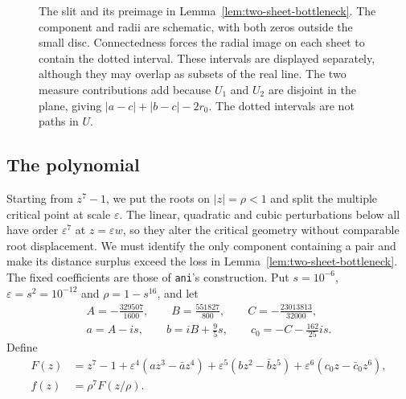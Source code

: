 \documentclass[11pt]{article}
\begin{document}
\begin{figure}[!htbp]
\caption{The slit and its preimage in Lemma~\ref{lem:two-sheet-bottleneck}.
The component and radii are schematic, with both zeros outside the small
disc. Connectedness forces the radial image on each sheet to contain the
dotted interval. These intervals are displayed separately, although they
may overlap as subsets of the real line. The two measure contributions
add because $U_1$ and $U_2$ are disjoint in the plane, giving
$|a-c|+|b-c|-2r_0$. The dotted intervals are not paths in $U$.}
\label{fig:two-sheet-bottleneck}
\end{figure}

\subsection{The polynomial}
Starting from $z^7-1$, we put the roots on $|z|=\rho<1$ and
split the multiple critical point at scale $\varepsilon$. The linear,
quadratic and cubic perturbations below all have order $\varepsilon^7$
at $z=\varepsilon w$, so they alter the critical geometry without
comparable root displacement. We must identify the only component
containing a pair and make its distance surplus exceed the loss in
Lemma~\ref{lem:two-sheet-bottleneck}. The fixed coefficients are those
of \texttt{ani}'s construction.
Put $s=10^{-6}$, $\varepsilon=s^2=10^{-12}$ and $\rho=1-s^{16}$, and let
\begin{gather*}
 A=-\frac{329507}{1600},\qquad B=\frac{551827}{800},\qquad
 C=-\frac{23013813}{32000},\\
 a=A-is,\qquad b=iB+\frac95s,\qquad c_0=-C-\frac{162}{25}is.
\end{gather*}
Define
\begin{align}
 F(z)&=z^7-1+\varepsilon^4(az^3-\bar a z^4)
      +\varepsilon^5(bz^2-\bar b z^5)
      +\varepsilon^6(c_0z-\bar c_0z^6),\label{eq:ani-F}\\
 f(z)&=\rho^7F(z/\rho).\label{eq:ani-f}
\end{align}
\end{document}
